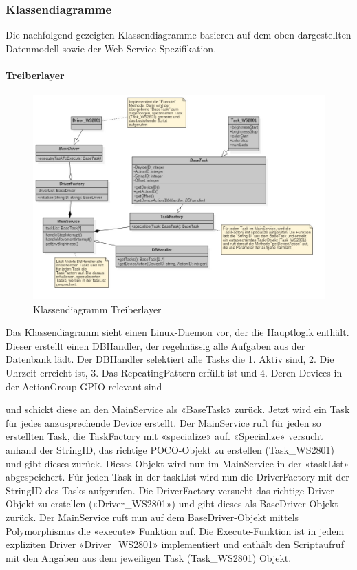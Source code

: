 \documentclass[]{article}
\let\oldparagraph\paragraph
\renewcommand{\paragraph}[1]{\oldparagraph{#1}\mbox{}}
\begin{document}
\newpage
\subsubsection{Klassendiagramme}\label{klassendiagramme}

Die nachfolgend gezeigten Klassendiagramme basieren auf dem oben
dargestellten Datenmodell sowie der Web Service Spezifikation.

\paragraph{Treiberlayer}\label{treiberlayer}

\begin{figure}[H]
\centering
\includegraphics{./WI20_Klassendiagramm_Treiberlayer.jpeg}
\caption{Klassendiagramm Treiberlayer}
\end{figure}

Das Klassendiagramm sieht einen Linux-Daemon vor, der die Hauptlogik
enthält. Dieser erstellt einen DBHandler, der regelmässig alle Aufgaben
aus der Datenbank lädt. Der DBHandler selektiert alle Tasks die 1. Aktiv
sind, 2. Die Uhrzeit erreicht ist, 3. Das RepeatingPattern erfüllt ist
und 4. Deren Devices in der ActionGroup GPIO relevant sind

und schickt diese an den MainService als «BaseTask» zurück. Jetzt wird
ein Task für jedes anzusprechende Device erstellt. Der MainService ruft
für jeden so erstellten Task, die TaskFactory mit «specialize» auf.
«Specialize» versucht anhand der StringID, das richtige POCO-Objekt zu
erstellen (Task\_WS2801) und gibt dieses zurück. Dieses Objekt wird nun
im MainService in der «taskList» abgespeichert. Für jeden Task in der
taskList wird nun die DriverFactory mit der StringID des Tasks
aufgerufen. Die DriverFactory versucht das richtige Driver-Objekt zu
erstellen («Driver\_WS2801») und gibt dieses als BaseDriver Objekt
zurück. Der MainService ruft nun auf dem BaseDriver-Objekt mittels
Polymorphismus die «execute» Funktion auf. Die Execute-Funktion ist in
jedem expliziten Driver «Driver\_WS2801» implementiert und enthält den
Scriptaufruf mit den Angaben aus dem jeweiligen Task (Task\_WS2801)
Objekt.
\end{document}
